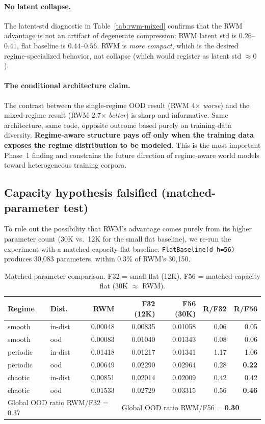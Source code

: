 \documentclass[11pt,a4paper]{article}
\begin{document}
\paragraph{No latent collapse.} The latent-std diagnostic in
Table~\ref{tab:rwm-mixed} confirms that the RWM advantage is not an
artifact of degenerate compression: RWM latent std is $0.26$--$0.41$,
flat baseline is $0.44$--$0.56$. RWM is \emph{more compact}, which is
the desired regime-specialized behavior, not collapse (which would
register as latent std $\approx 0$).

\paragraph{The conditional architecture claim.} The contrast between
the single-regime OOD result (RWM 4$\times$ \emph{worse}) and the
mixed-regime result (RWM 2.7$\times$ \emph{better}) is sharp and
informative. Same architecture, same code, opposite outcome based
purely on training-data diversity. \textbf{Regime-aware structure pays
off only when the training data exposes the regime distribution to be
modeled.} This is the most important Phase~1 finding and constrains
the future direction of regime-aware world models toward heterogeneous
training corpora.

\subsection{Capacity hypothesis falsified (matched-parameter test)}
\label{sec:rwm-capacity}

To rule out the possibility that RWM's advantage comes purely from its
higher parameter count (30K vs.\ 12K for the small flat baseline), we
re-run the experiment with a matched-capacity flat baseline:
\verb|FlatBaseline(d_h=56)| produces 30,083 parameters, within 0.3\% of
RWM's 30,150.

\begin{table}[h]
\centering
\caption{Matched-parameter comparison. F32 = small flat (12K),
F56 = matched-capacity flat (30K $\approx$ RWM).}
\label{tab:rwm-matched}
\begin{tabular}{llrrrrr}
\toprule
Regime & Dist. & RWM & F32 (12K) & F56 (30K) & R/F32 & R/F56 \\
\midrule
smooth & in-dist & 0.00048 & 0.00835 & 0.01058 & 0.06 & 0.05 \\
smooth & ood     & 0.00083 & 0.01040 & 0.01343 & 0.08 & 0.06 \\
periodic & in-dist & 0.01418 & 0.01217 & 0.01341 & 1.17 & 1.06 \\
periodic & ood   & 0.00649 & 0.02290 & 0.02964 & 0.28 & \textbf{0.22} \\
chaotic & in-dist & 0.00851 & 0.02014 & 0.02009 & 0.42 & 0.42 \\
chaotic & ood    & 0.01533 & 0.02729 & 0.03315 & 0.56 & \textbf{0.46} \\
\midrule
\multicolumn{3}{l}{Global OOD ratio RWM/F32 = 0.37} & \multicolumn{4}{l}{Global OOD ratio RWM/F56 = \textbf{0.30}} \\
\bottomrule
\end{tabular}
\end{table}
\end{document}
